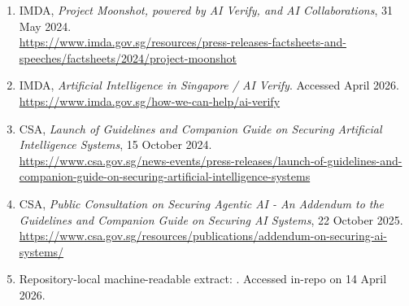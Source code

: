 \documentclass[11pt,a4paper]{article}
\begin{document}
\begin{enumerate}[leftmargin=1.2cm]
    \item IMDA, \emph{Project Moonshot, powered by AI Verify, and AI Collaborations}, 31 May 2024.\\
    \url{https://www.imda.gov.sg/resources/press-releases-factsheets-and-speeches/factsheets/2024/project-moonshot}

    \item IMDA, \emph{Artificial Intelligence in Singapore / AI Verify}. Accessed April 2026.\\
    \url{https://www.imda.gov.sg/how-we-can-help/ai-verify}

    \item CSA, \emph{Launch of Guidelines and Companion Guide on Securing Artificial Intelligence Systems}, 15 October 2024.\\
    \url{https://www.csa.gov.sg/news-events/press-releases/launch-of-guidelines-and-companion-guide-on-securing-artificial-intelligence-systems}

    \item CSA, \emph{Public Consultation on Securing Agentic AI - An Addendum to the Guidelines and Companion Guide on Securing AI Systems}, 22 October 2025.\\
    \url{https://www.csa.gov.sg/resources/publications/addendum-on-securing-ai-systems/}

    \item Repository-local machine-readable extract: . Accessed in-repo on 14 April 2026.
\end{enumerate}
\end{document}
